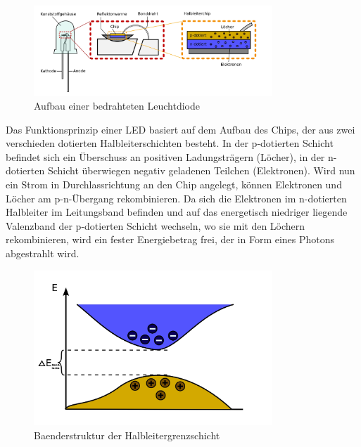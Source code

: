 \documentclass[11pt]{scrartcl}
\begin{document}
\begin{figure}[ht]
\begin{center}
\includegraphics[width=0.8\textwidth]{images/ledaufbau.jpg}
\end{center}
\vspace{-1.5\baselineskip}
\caption{Aufbau einer bedrahteten Leuchtdiode}
\label{LED-Aufbau}
\end{figure}

Das Funktionsprinzip einer LED basiert auf dem Aufbau des Chips, der aus zwei verschieden dotierten Halbleiterschichten besteht. In der p-dotierten Schicht befindet sich ein Überschuss an positiven Ladungsträgern (Löcher), in der n-dotierten Schicht überwiegen negativ geladenen Teilchen (Elektronen). Wird nun ein Strom in Durchlassrichtung an den Chip angelegt, können Elektronen und Löcher am p-n-Übergang rekombinieren. Da sich die Elektronen im n-dotierten Halbleiter im Leitungsband befinden und auf das energetisch niedriger liegende Valenzband der p-dotierten Schicht wechseln, wo sie mit den Löchern rekombinieren, wird ein fester Energiebetrag frei, der in Form eines Photons abgestrahlt wird.

\begin{figure}[ht]
\begin{center}
\includegraphics[width=0.8\textwidth]{images/band.jpg}
\end{center}
\vspace{-1.5\baselineskip}
\caption{Baenderstruktur der Halbleitergrenzschicht}
\label{Baendermodell}
\end{figure}
\end{document}
